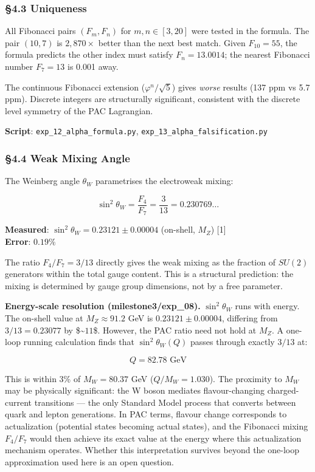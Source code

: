 \documentclass[
  11pt,
  a4paper]{article}
\begin{document}
\subsubsection{§4.3 Uniqueness}\label{uniqueness}

All Fibonacci pairs \((F_m, F_n)\) for \(m, n \in [3, 20]\) were tested
in the formula. The pair \((10, 7)\) is \(2{,}870\times\) better than
the next best match. Given \(F_{10} = 55\), the formula predicts the
other index must satisfy \(F_n = 13.0014\); the nearest Fibonacci number
\(F_7 = 13\) is 0.001 away.

The continuous Fibonacci extension (\(\varphi^n/\sqrt{5}\)) gives
\emph{worse} results (137 ppm vs 5.7 ppm). Discrete integers are
structurally significant, consistent with the discrete level symmetry of
the PAC Lagrangian.

\textbf{Script}: \texttt{exp\_12\_alpha\_formula.py},
\texttt{exp\_13\_alpha\_falsification.py}

\subsubsection{§4.4 Weak Mixing Angle}\label{weak-mixing-angle}

The Weinberg angle \(\theta_W\) parametrises the electroweak mixing:

\[\sin^2\theta_W = \frac{F_4}{F_7} = \frac{3}{13} = 0.230769\ldots\]

\textbf{Measured}: \(\sin^2\theta_W = 0.23121 \pm 0.00004\) (on-shell,
\(M_Z\)) {[}1{]}\\
\textbf{Error}: \(0.19\%\)

The ratio \(F_4/F_7 = 3/13\) directly gives the weak mixing as the
fraction of \(SU(2)\) generators within the total gauge content. This is
a structural prediction: the mixing is determined by gauge group
dimensions, not by a free parameter.

\textbf{Energy-scale resolution (milestone3/exp\_08).}
\(\sin^2\theta_W\) runs with energy. The on-shell value at
\(M_Z \approx 91.2\) GeV is \(0.23121 \pm 0.00004\), differing from
\(3/13 = 0.23077\) by \$\sim\(11\)\sigma\$. However, the PAC ratio need
not hold at \(M_Z\). A one-loop running calculation finds that
\(\sin^2\theta_W(Q)\) passes through exactly \(3/13\) at:

\[Q = 82.78 \text{ GeV}\]

This is within 3\% of \(M_W = 80.37\) GeV (\(Q/M_W = 1.030\)). The
proximity to \(M_W\) may be physically significant: the W boson mediates
flavour-changing charged-current transitions --- the only Standard Model
process that converts between quark and lepton generations. In PAC
terms, flavour change corresponds to actualization (potential states
becoming actual states), and the Fibonacci mixing \(F_4/F_7\) would then
achieve its exact value at the energy where this actualization mechanism
operates. Whether this interpretation survives beyond the one-loop
approximation used here is an open question.
\end{document}
